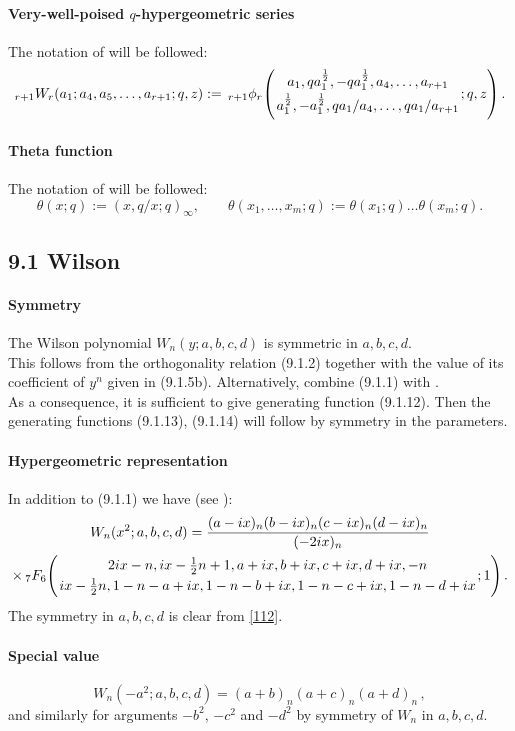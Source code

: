 \documentclass[twoside,11pt]{article}
\newcommand\tha\theta
\newcommand\half{\frac12}
\newcommand\thalf{\tfrac12}
\newcommand\iy\infty
\newcommand{\hyp}[5]{\,\mbox{}_{#1}F_{#2}\!\left(
  \genfrac{}{}{0pt}{}{#3}{#4};#5\right)}
\newcommand{\qhyp}[5]{\,\mbox{}_{#1}\phi_{#2}\!\left(
  \genfrac{}{}{0pt}{}{#3}{#4};#5\right)}
\begin{document}
\paragraph{Very-well-poised $q$-hypergeometric series}
The notation of  will be followed:
\begin{equation}
{}_{r+1}W_r(a_1;a_4,a_5,\ldots,a_{r+1};q,z):=
\qhyp{r+1}r{a_1,qa_1^\half,-qa_1^\half,a_4,\ldots,a_{r+1}}
{a_1^\half,-a_1^\half,qa_1/a_4,\ldots,qa_1/a_{r+1}}{q,z}.
\label{111}
\end{equation}
%
\paragraph{Theta function}
The notation of  will be followed:
\begin{equation}
\tha(x;q):=(x,q/x;q)_\iy,\qquad
\tha(x_1,\ldots,x_m;q):=\tha(x_1;q)\ldots\tha(x_m;q).
\label{117}
\end{equation}
%
\subsection*{9.1 Wilson}
\label{sec9.1}
%
\paragraph{Symmetry}
The Wilson polynomial $W_n(y;a,b,c,d)$ is symmetric
in $a,b,c,d$.
\\
This follows from the orthogonality relation (9.1.2)
together with the value of its coefficient of $y^n$ given in (9.1.5b).
Alternatively, combine (9.1.1) with .\\
As a consequence, it is sufficient to give generating function (9.1.12). Then the generating
functions (9.1.13), (9.1.14) will follow by symmetry in the parameters.
%
\paragraph{Hypergeometric representation}
In addition to (9.1.1) we have (see ):
\begin{multline}
W_n(x^2;a,b,c,d)
=\frac{(a-ix)_n (b-ix)_n (c-ix)_n (d-ix)_n}{(-2ix)_n}\\
\times\hyp76{2ix-n,ix-\thalf n+1,a+ix,b+ix,c+ix,d+ix,-n}
{ix-\thalf n,1-n-a+ix,1-n-b+ix,1-n-c+ix,1-n-d+ix}1.
\label{112}
\end{multline}
The symmetry in $a,b,c,d$ is clear from \eqref{112}.
%
\paragraph{Special value}
\begin{equation}
W_n(-a^2;a,b,c,d)=(a+b)_n(a+c)_n(a+d)_n\,,
\label{91}
\end{equation}
and similarly for arguments $-b^2$, $-c^2$ and
$-d^2$ by symmetry of $W_n$ in $a,b,c,d$.
%
\end{document}
